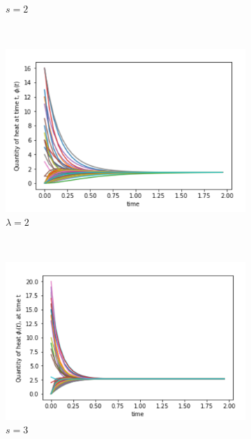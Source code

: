 \documentclass[10pt,a4paper]{article}
\begin{document}
\begin{figure}[H]
\begin{subfigure}[b]{0.45\textwidth}
        		\caption{$s=2$}
        	\end{subfigure}~
        	\begin{subfigure}[b]{0.45\textwidth}
        		\includegraphics[width= \textwidth]{images/Barabasi-Laplace2.png}
        		\caption{$\lambda=2$}
        	\end{subfigure}\\
        	\begin{subfigure}[b]{0.45\textwidth}
        		\includegraphics[width= \textwidth]{images/Barabasi-Mellin3.png}
        		\caption{$s=3$}
        	\end{subfigure}~
        	\begin{subfigure}[b]{0.45\textwidth}

\end{subfigure}
\end{figure}
\end{document}
